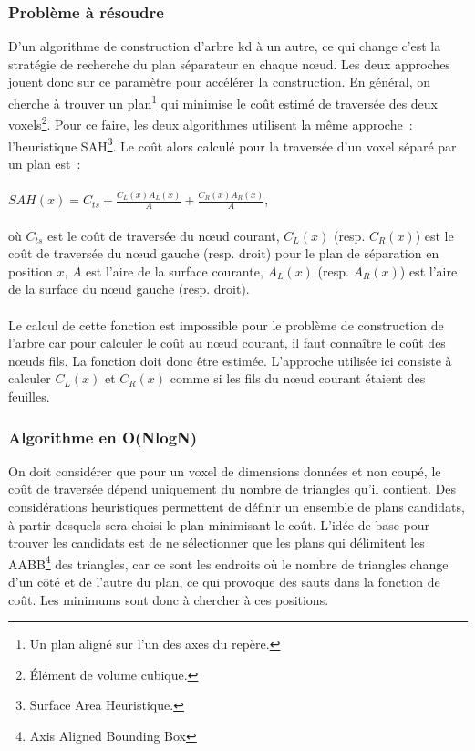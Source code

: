 \documentclass[a4paper]{article}
\begin{document}
\subsubsection{Problème à résoudre}
D'un algorithme de construction d'arbre kd à un autre, ce qui change c'est la stratégie de recherche du plan séparateur en chaque nœud. Les deux approches jouent donc sur ce paramètre pour accélérer la construction. En général, on cherche à trouver un plan\footnote{Un plan aligné sur l'un des axes du repère.} qui minimise le coût estimé de traversée des deux voxels\footnote{Élément de volume cubique.}. Pour ce faire, les deux algorithmes utilisent la même approche~: l'heuristique SAH\footnote{Surface Area Heuristique.}. Le coût alors calculé pour la traversée d'un voxel séparé par un plan est~:
\\\\
$SAH(x) = C_{ts} + \frac{C_L(x)A_L(x)}{A} + \frac{C_R(x)A_R(x)}{A}$,
\\\\
où $C_{ts}$ est le coût de traversée du nœud courant, $C_L(x)$ (resp. $C_R(x)$) est le coût de traversée du nœud gauche (resp. droit) pour le plan de séparation en position $x$, $A$ est l'aire de la surface courante, $A_L(x)$ (resp. $A_R(x)$) est l'aire de la surface du nœud gauche (resp. droit).
\\\\
Le calcul de cette fonction est impossible pour le problème de construction de l'arbre car pour calculer le coût au nœud courant, il faut connaître le coût des nœuds fils. La fonction doit donc être estimée. L'approche utilisée ici consiste à calculer $C_L(x)$ et $C_R(x)$ comme si les fils du nœud courant étaient des feuilles.

\subsubsection{Algorithme en O(NlogN)}
On doit considérer que pour un voxel de dimensions données et non coupé, le coût de traversée dépend uniquement du nombre de triangles qu'il contient.
Des considérations heuristiques permettent de définir un ensemble de plans candidats, à partir desquels sera choisi le plan minimisant le coût. L'idée de base pour trouver les candidats est de ne sélectionner que les plans qui délimitent les AABB\footnote{Axis Aligned Bounding Box} des triangles, car ce sont les endroits où le nombre de triangles change d'un c\^oté et de l'autre du plan, ce qui provoque des sauts dans la fonction de co\^ut. Les minimums sont donc à chercher à ces positions.
\end{document}
